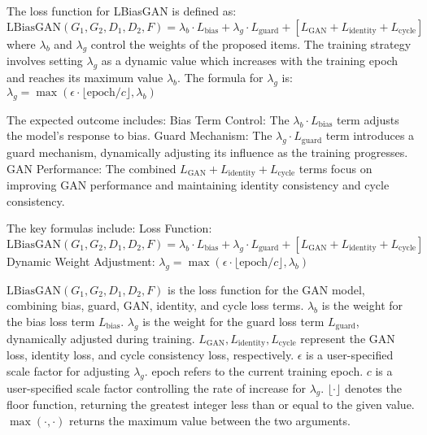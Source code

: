 The loss function for LBiasGAN is defined as:
$ \text{LBiasGAN}(G_1, G_2, D_1, D_2, F) = \lambda_b \cdot L_{\text{bias}} + \lambda_g \cdot L_{\text{guard}} + [L_{\text{GAN}} + L_{\text{identity}} + L_{\text{cycle}}] $
where $ \lambda_b $ and $ \lambda_g $ control the weights of the proposed items.
The training strategy involves setting $ \lambda_g $ as a dynamic value which increases with the training epoch and reaches its maximum value $ \lambda_b $. The formula for $ \lambda_g $ is:
$ \lambda_g = \max(\epsilon \cdot \lfloor \text{epoch} / c \rfloor, \lambda_b) $

The expected outcome includes:
Bias Term Control: The $ \lambda_b \cdot L_{\text{bias}} $ term adjusts the model's response to bias.
Guard Mechanism: The $ \lambda_g \cdot L_{\text{guard}} $ term introduces a guard mechanism, dynamically adjusting its influence as the training progresses.
GAN Performance: The combined $ L_{\text{GAN}} + L_{\text{identity}} + L_{\text{cycle}} $ terms focus on improving GAN performance and maintaining identity consistency and cycle consistency.

The key formulas include:
Loss Function:
$ \text{LBiasGAN}(G_1, G_2, D_1, D_2, F) = \lambda_b \cdot L_{\text{bias}} + \lambda_g \cdot L_{\text{guard}} + [L_{\text{GAN}} + L_{\text{identity}} + L_{\text{cycle}}] $
Dynamic Weight Adjustment:
$ \lambda_g = \max(\epsilon \cdot \lfloor \text{epoch} / c \rfloor, \lambda_b) $

$ \text{LBiasGAN}(G_1, G_2, D_1, D_2, F) $ is the loss function for the GAN model, combining bias, guard, GAN, identity, and cycle loss terms.
$ \lambda_b $ is the weight for the bias loss term $ L_{\text{bias}} $.
$ \lambda_g $ is the weight for the guard loss term $ L_{\text{guard}} $, dynamically adjusted during training.
$ L_{\text{GAN}}, L_{\text{identity}}, L_{\text{cycle}} $ represent the GAN loss, identity loss, and cycle consistency loss, respectively.
$ \epsilon $ is a user-specified scale factor for adjusting $ \lambda_g $.
$ \text{epoch} $ refers to the current training epoch.
$ c $ is a user-specified scale factor controlling the rate of increase for $ \lambda_g $.
$ \lfloor \cdot \rfloor $ denotes the floor function, returning the greatest integer less than or equal to the given value.
$ \max(\cdot, \cdot) $ returns the maximum value between the two arguments.
